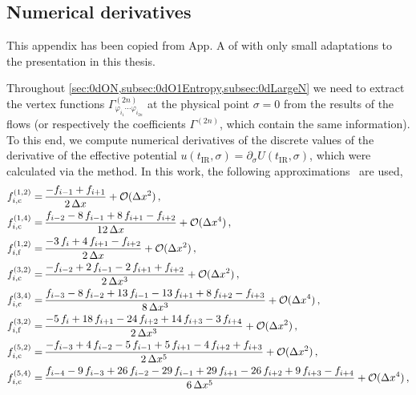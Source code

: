 \subsection{Numerical derivatives}
\begin{disclaimer}
	This appendix has been copied from App. A of  with only small adaptations to the presentation in this thesis.
\end{disclaimer}
Throughout \cref{sec:0dON,subsec:0dO1Entropy,subsec:0dLargeN} we need to extract the \ipi{} vertex functions $\Gamma^{(2n)}_{\varphi_{i_1} \cdots \varphi_{i_{2n}}}$ at the physical point $\sigma = 0$ from the \ir{} results of the \frg{} flows (or respectively the coefficients $\Gamma^{(2n)}$, which contain the same information).
To this end, we compute numerical derivatives of the discrete values of the derivative of the effective potential $u ( t_\mathrm{IR}, \sigma ) = \partial_\sigma U ( t_\mathrm{IR}, \sigma )$, which were calculated via the \fv{} method.
In this work, the following \fd{} approximations~\cite{Fornberg1988,abramowitz+stegun} are used,
\begin{align}
	f^{(1,2)}_{i , \mathrm{c}} = \, & \frac{- f_{i - 1} + f_{i + 1}}{2 \, \Delta x} + \mathcal{O} ( \Delta x^2 ) \, ,		\label{eq:derivative_1_central_error_2}
	\\
	f^{(1,4)}_{i , \mathrm{c}} = \, & \frac{f_{i - 2} - 8 \, f_{i - 1} + 8 \, f_{i + 1} - f_{i + 2}}{12 \, \Delta x} + \mathcal{O} ( \Delta x^4 ) \, ,		\label{eq:derivative_1_central_error_4}
	\\
	f^{(1,2)}_{i , \mathrm{f}}  = \, & \frac{- 3 \, f_i + 4 \, f_{i + 1} - f_{i + 2}}{2 \, \Delta x} + \mathcal{O} ( \Delta x^2 ) \, ,		\label{eq:derivative_1_forward_error_2}
	\\
	f^{(3,2)}_{i , \mathrm{c}} = \, & \frac{- f_{i - 2} + 2 \, f_{i - 1} - 2 \, f_{i + 1} + f_{i + 2}}{2 \, \Delta x^3} + \mathcal{O} ( \Delta x^2 ) \, ,		\label{eq:derivative_3_central_error_2}
	\\
	f^{(3,4)}_{i , \mathrm{c}} = \, & \frac{f_{i - 3} - 8 \, f_{i - 2} + 13 \, f_{i - 1} - 13 \, f_{i + 1} + 8 \,  f_{i + 2} - f_{i + 3}}{8 \, \Delta x^3} + \mathcal{O} ( \Delta x^4 ) \, ,		\label{eq:derivative_3_central_error_4}
	\\
	f^{(3,2)}_{i , \mathrm{f}} = \, & \frac{- 5 \, f_{i} + 18 \, f_{i + 1} - 24 \, f_{i + 2} + 14 \, f_{i + 3} - 3 \, f_{i + 4} }{2 \, \Delta x^3} + \mathcal{O} ( \Delta x^2 ) \, ,		\label{eq:derivative_3_central_error_1}
	\\
	f^{(5,2)}_{i , \mathrm{c}} = \, & \frac{- f_{i - 3} + 4 \, f_{i - 2} - 5 \, f_{i - 1} + 5 \, f_{i + 1} - 4 \,  f_{i + 2} + f_{i + 3}}{2 \, \Delta x^5} + \mathcal{O} ( \Delta x^2 ) \, ,		\label{eq:derivative_5_central_error_2}
	\\
	f^{(5,4)}_{i , \mathrm{c}} = \, & \frac{f_{i - 4} - 9 \, f_{i - 3} + 26 \, f_{i - 2} - 29 \, f_{i - 1} + 29 \, f_{i + 1} - 26 \,  f_{i + 2} + 9 \, f_{i + 3} - f_{i + 4} }{6 \, \Delta x^5} + \mathcal{O} ( \Delta x^4 ) \, ,		\label{eq:derivative_5_central_error_4}
\end{align}
